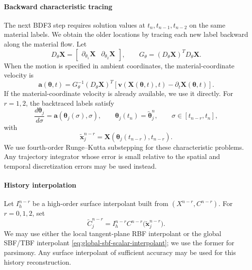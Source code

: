 \documentclass[a4paper,fleqn]{cas-sc}
\begin{document}
\paragraph{Backward characteristic tracing}
The next BDF3 step requires solution values at $t_n,t_{n-1},t_{n-2}$ on the
same material labels.  We obtain the older locations by tracing each new label
backward along the material flow.  Let
\[
  D_\theta\bm X
  =
  \begin{bmatrix}
    \partial_{\theta_1}\bm X & \partial_{\theta_2}\bm X
  \end{bmatrix},
  \qquad
  G_\theta=(D_\theta\bm X)^TD_\theta\bm X.
\]
When the motion is specified in ambient coordinates, the material-coordinate
velocity is
\begin{equation}
  \bm a(\bm\theta,t)
  =
  G_\theta^{-1}(D_\theta\bm X)^T
  \left[
    \bm v(\bm X(\bm\theta,t),t)-\partial_t\bm X(\bm\theta,t)
  \right].
  \label{eq:material-coordinate-velocity}
\end{equation}
If the material-coordinate velocity is already available, we use it directly.
For $r=1,2$, the backtraced labels satisfy
\begin{equation}
  \frac{d\bm\theta_j}{d\sigma}
  =
  \bm a(\bm\theta_j(\sigma),\sigma),
  \qquad
  \bm\theta_j(t_n)=\widetilde{\bm\theta}_j^n,
  \qquad
  \sigma\in[t_{n-r},t_n],
  \label{eq:sl-backtrace}
\end{equation}
with
\[
  \widetilde{\bm x}_j^{n-r}
  =
  \bm X(\bm\theta_j(t_{n-r}),t_{n-r}).
\]
We use fourth-order Runge--Kutta substepping for these characteristic
problems.  Any trajectory integrator whose error is small relative to the
spatial and temporal discretization errors may be used instead.

\paragraph{History interpolation}
Let $I_h^{n-r}$ be a high-order surface interpolant built from
$(X^{n-r},C^{n-r})$.  For $r=0,1,2$, set
\begin{equation}
  \widetilde C_j^{n-r}
  =
  I_h^{n-r}C^{n-r}
  \bigl(\widetilde{\bm x}_j^{n-r}\bigr).
  \label{eq:history-transfer}
\end{equation}
We may use either the local tangent-plane RBF interpolant or the global SBF/TBF
interpolant \eqref{eq:global-sbf-scalar-interpolant}; we use the former for parsimony.  Any surface interpolant of sufficient accuracy may be used for this history
reconstruction.
\end{document}
